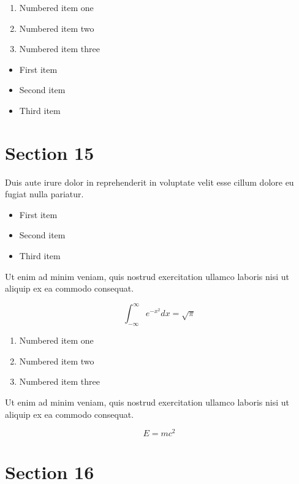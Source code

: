\documentclass{article}
\begin{document}
\begin{enumerate}
\item Numbered item one
\item Numbered item two
\item Numbered item three
\end{enumerate}

\begin{itemize}
\item First item
\item Second item
\item Third item
\end{itemize}

\section{Section 15}

Duis aute irure dolor in reprehenderit in voluptate velit esse cillum dolore eu fugiat nulla pariatur.

\begin{itemize}
\item First item
\item Second item
\item Third item
\end{itemize}

Ut enim ad minim veniam, quis nostrud exercitation ullamco laboris nisi ut aliquip ex ea commodo consequat.

\begin{equation}
    \int_{-\infty}^{\infty} e^{-x^2} dx = \sqrt{\pi}
\end{equation}

\begin{enumerate}
\item Numbered item one
\item Numbered item two
\item Numbered item three
\end{enumerate}

Ut enim ad minim veniam, quis nostrud exercitation ullamco laboris nisi ut aliquip ex ea commodo consequat.


\begin{equation}
    E = mc^2
\end{equation}

\section{Section 16}
\end{document}
